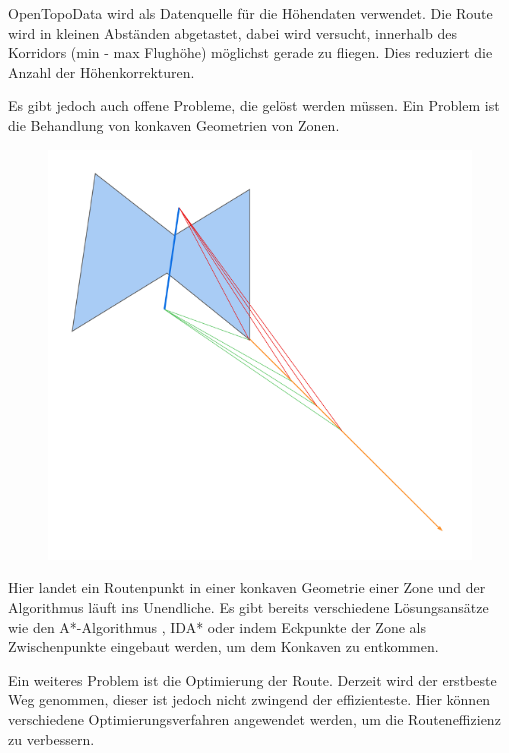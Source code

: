 OpenTopoData wird als Datenquelle für die Höhendaten verwendet. Die Route wird in kleinen Abständen abgetastet, dabei wird versucht, innerhalb des Korridors (min - max Flughöhe) möglichst gerade zu fliegen. Dies reduziert die Anzahl der Höhenkorrekturen.

Es gibt jedoch auch offene Probleme, die gelöst werden müssen. Ein Problem ist die Behandlung von konkaven Geometrien von Zonen.

\begin{figure}[!h]
    \begin{center}
        \includegraphics[scale=0.35]{images/konkaves-problem}
    \end{center}
\end{figure}

Hier landet ein Routenpunkt in einer konkaven Geometrie einer Zone und der Algorithmus läuft ins Unendliche. Es gibt bereits verschiedene Lösungsansätze wie den A*-Algorithmus \cite{Algorithmus2022}, IDA* \cite{IDA2021} oder indem Eckpunkte der Zone als Zwischenpunkte eingebaut werden, um dem Konkaven zu entkommen.

Ein weiteres Problem ist die Optimierung der Route. Derzeit wird der erstbeste Weg genommen, dieser ist jedoch nicht zwingend der effizienteste. Hier können verschiedene Optimierungsverfahren angewendet werden, um die Routeneffizienz zu verbessern.


